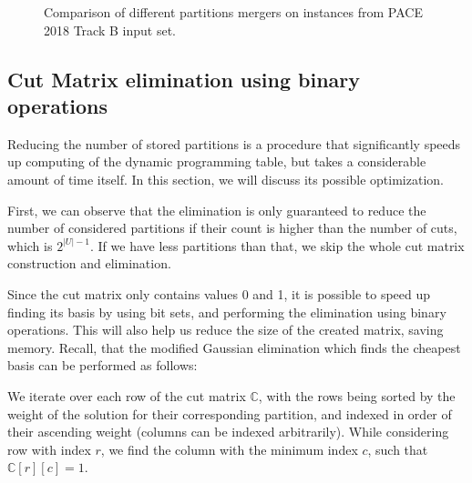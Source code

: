 \documentclass[thesis=M,english,hidelinks]{FITthesis}[2012/10/20]
\theoremstyle{definition}
\begin{document}
\begin{figure}[ht]
    \centering
    \caption{Comparison of different partitions mergers on instances from PACE 2018 Track B input set.}
    \label{fig:partcomp}
\end{figure}

\subsection{Cut Matrix elimination using binary operations}

Reducing the number of stored partitions is a procedure that significantly speeds up computing of the dynamic
programming table, but takes a considerable amount of time itself. In this section, we will discuss its possible
optimization.

First, we can observe that the elimination is only guaranteed to reduce the number of considered partitions if their
count is higher than the number of cuts, which is $2^{|U|-1}$. If we have less partitions than that, we skip the whole
cut matrix construction and elimination.

Since the cut matrix only contains values 0 and 1, it is possible to speed up finding its basis by using bit sets, and
performing the elimination using binary operations. This will also help us reduce the size of the created matrix, saving
memory. Recall, that the modified Gaussian elimination which finds the cheapest basis can be performed as follows:

We iterate over each row of the cut matrix $\mathbb{C}$, with the rows being sorted by the weight of the solution for
their corresponding partition, and indexed in order of their ascending weight (columns can be indexed arbitrarily). While
considering row with index $r$, we find the column with the minimum index $c$, such that $\mathbb{C}[r][c] = 1$.
\end{document}

